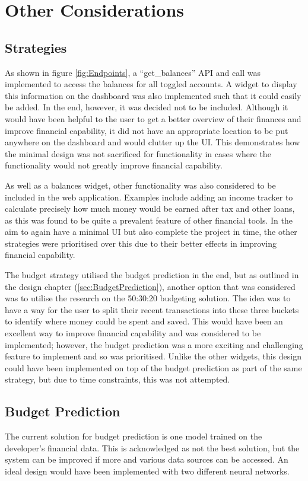 \section{Other Considerations}

\subsection{Strategies}
As shown in figure \ref{fig:Endpoints}, a ``get\_balances'' API and call was implemented to access the balances for all toggled accounts. A widget to display this information on the dashboard was also implemented such that it could easily be added. In the end, however, it was decided not to be included. Although it would have been helpful to the user to get a better overview of their finances and improve financial capability, it did not have an appropriate location to be put anywhere on the dashboard and would clutter up the UI. This demonstrates how the minimal design was not sacrificed for functionality in cases where the functionality would not greatly improve financial capability.

As well as a balances widget, other functionality was also considered to be included in the web application. Examples include adding an income tracker to calculate precisely how much money would be earned after tax and other loans, as this was found to be quite a prevalent feature of other financial tools. In the aim to again have a minimal UI but also complete the project in time, the other strategies were prioritised over this due to their better effects in improving financial capability.

The budget strategy utilised the budget prediction in the end, but as outlined in the design chapter (\ref{sec:BudgetPrediction}), another option that was considered was to utilise the research on the 50:30:20 budgeting solution. The idea was to have a way for the user to split their recent transactions into these three buckets to identify where money could be spent and saved. This would have been an excellent way to improve financial capability and was considered to be implemented; however, the budget prediction was a more exciting and challenging feature to implement and so was prioritised. Unlike the other widgets, this design could have been implemented on top of the budget prediction as part of the same strategy, but due to time constraints, this was not attempted.

\subsection{Budget Prediction}
The current solution for budget prediction is one model trained on the developer's financial data. This is acknowledged as not the best solution, but the system can be improved if more and various data sources can be accessed. An ideal design would have been implemented with two different neural networks.

